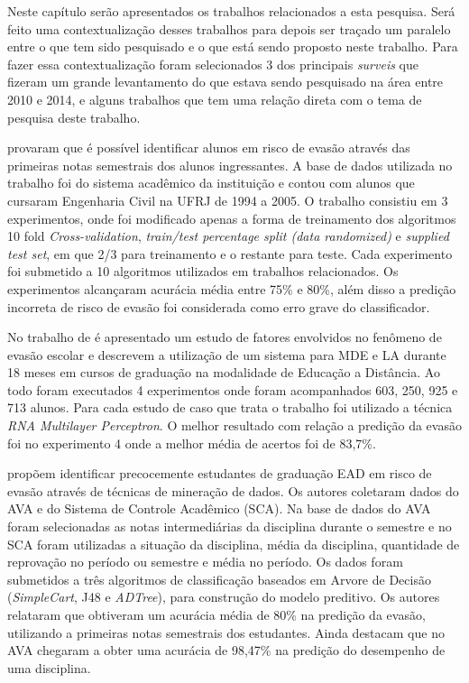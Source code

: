 \documentclass[diss,capa]{texufpel}
\begin{document}
Neste capítulo serão apresentados os trabalhos relacionados a esta pesquisa.
Será feito uma contextualização desses trabalhos para depois ser traçado um paralelo entre o que tem sido pesquisado e o que está sendo proposto neste trabalho.
Para fazer essa contextualização foram selecionados 3 dos principais \textit{surveis} que fizeram um grande levantamento do que estava sendo pesquisado na área entre 2010 e 2014, e alguns trabalhos que tem uma relação direta com o tema de pesquisa deste trabalho.


\citealp{Manhaes2011} provaram que é possível identificar alunos em risco de evasão através das primeiras notas semestrais dos alunos ingressantes.
A base de dados utilizada no trabalho foi do sistema acadêmico da instituição e contou com alunos que cursaram Engenharia Civil na UFRJ de 1994 a 2005.
O trabalho consistiu em 3 experimentos, onde foi modificado apenas a forma de treinamento dos algoritmos 10 fold \textit{Cross-validation}, \textit{train/test percentage split (data randomized)} e \textit{supplied test set}, em que 2/3 para treinamento e o restante para teste.
Cada experimento foi submetido a 10 algoritmos utilizados em trabalhos relacionados.
Os experimentos alcançaram acurácia média entre 75\% e 80\%, além disso a predição incorreta de risco de evasão foi considerada como erro grave do classificador.

No trabalho de \citealp{rigo2014aplicaccoes} é apresentado um estudo de fatores envolvidos no fenômeno de evasão escolar e descrevem a utilização de um sistema para MDE e LA durante 18 meses em cursos de graduação na modalidade de Educação a Distância.
Ao todo foram executados 4 experimentos onde foram acompanhados 603, 250, 925 e 713 alunos.
Para cada estudo de caso que trata o trabalho foi utilizado a técnica \textit{RNA Multilayer Perceptron}.
O melhor resultado com relação a predição da evasão foi no experimento 4 onde a melhor média de acertos foi de 83,7\%.

\citealp{Santos2014} propõem identificar precocemente estudantes de graduação EAD em risco de evasão através de técnicas de mineração de dados.
Os autores coletaram dados do AVA e do Sistema de Controle Acadêmico (SCA).
Na base de dados do AVA foram selecionadas as notas intermediárias da disciplina durante o semestre e no SCA foram utilizadas a situação da disciplina, média da disciplina, quantidade de reprovação no período ou semestre e média no período.
Os dados foram submetidos a três algoritmos de classificação baseados em Arvore de Decisão (\textit{SimpleCart}, J48 e \textit{ADTree}), para construção do modelo preditivo.
Os autores relataram que obtiveram um acurácia média de 80\% na predição da evasão, utilizando a primeiras notas semestrais dos estudantes.
Ainda destacam que no AVA chegaram a obter uma acurácia de 98,47\% na predição do desempenho de uma disciplina.
\end{document}
